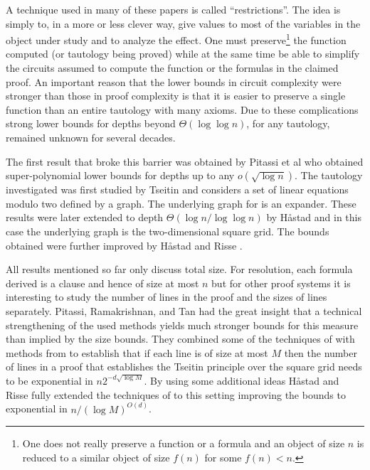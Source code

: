 \documentclass{article}\usepackage[a4paper,margin=20mm]{geometry}
\begin{document}
A technique used in many of these papers is called ``restrictions''.
The idea is simply to, in a more or less
clever way, give values to most of the
variables in the object under study and to analyze
the effect.  One must preserve\footnote{One does not really
preserve a function or a formula and an object of size $n$ is
reduced to a similar object of size $f(n)$ for some $f(n) < n$.}
the function computed (or tautology being proved) while 
at the same time be able to
simplify the circuits assumed to compute the function or
the formulas in the claimed proof.
An important reason that the lower bounds in circuit complexity
were stronger than those in proof complexity
is that it is easier to preserve a single function
than an entire tautology with many axioms.
Due to these complications strong lower bounds for
depths beyond $\Theta( \log {\log n})$, for any tautology, remained unknown for 
several decades.  

The first result that broke this barrier was 
obtained by Pitassi et al \cite{pitassi16frege}
who obtained super-polynomial lower bounds for
depths up to any $o(\sqrt {\log n})$.
The tautology investigated was first studied by Tseitin \cite{tseitin}
and considers a set of linear equations modulo two defined
by a graph.  The underlying graph for
\cite{pitassi16frege} is an expander.  These results were
later extended to depth $\Theta( \log n / \log {\log n})$
by H{\aa}stad \cite{jhtseitin}
and in this case the underlying graph is the two-dimensional square grid.
The bounds obtained were further improved by 
H{\aa}stad and Risse \cite{jhkr}.

All results mentioned so far only discuss total size.  For
resolution, each formula derived is a clause and hence of size 
at most $n$ but
for other proof systems it is interesting to study
the number of lines in the proof and the sizes of lines
separately.  Pitassi, Ramakrishnan,
and Tan \cite{PRT21} had the great insight that a technical
strengthening of the used methods yields much
stronger bounds for this measure than implied by the
size bounds.  They combined some of the techniques
of \cite{jhtseitin} with methods from \cite{pitassi16frege}
to establish that if each line is of size at most $M$ then
the number of lines in a proof that establishes the Tseitin
principle over the square grid needs to be exponential in $n2^{-d \sqrt {\log M}}$.
By using some additional ideas H{\aa}stad and Risse \cite{jhkr}
fully extended the techniques of \cite{jhtseitin}
to this setting improving the bounds to exponential
in $n/(\log M)^{O(d)}$.
\end{document}
